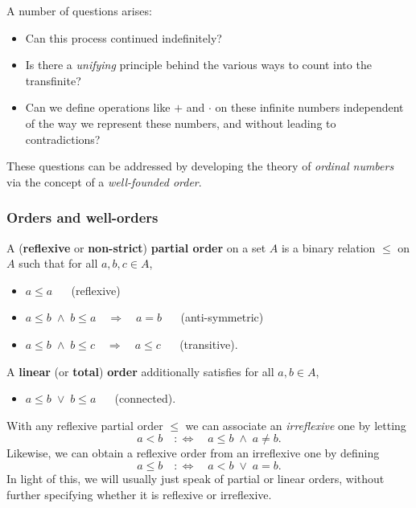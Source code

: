 A number of questions arises:

\begin{itemize}
\item Can this process continued indefinitely?
\item Is there a \textit{unifying} principle behind the various ways to count into the transfinite?
\item Can we define operations like $+$ and $\cdot$ on these infinite numbers independent of the way we represent these numbers, and without leading to contradictions?
\end{itemize}

These questions can be addressed by developing the theory of \textit{ordinal numbers} via the concept of a \textit{well-founded order}.

\subsubsection{Orders and well-orders}

\begin{definition}A (\textbf{reflexive} or \textbf{non-strict}) \textbf{partial order} on a set $A$ is a binary relation $\leq$ on $A$ such that for all $a,b,c \in A$,

\begin{itemize}
\item $a\leq a$   (reflexive)


\item $a \leq b \; \wedge \; b \leq a \quad \Rightarrow \quad a = b$   (anti-symmetric)


\item $a \leq b \; \wedge \; b \leq c \quad \Rightarrow \quad a \leq c$   (transitive).
\end{itemize}

A \textbf{linear} (or \textbf{total}) \textbf{order} additionally satisfies for all $a,b \in A$,

\begin{itemize}
\item $a \leq b \; \vee \; b \leq a$    (connected).
\end{itemize}

\end{definition}With any reflexive partial order $\leq$ we can associate an \textit{irreflexive} one by letting
\begin{equation}
a < b \quad :\iff \quad a \leq b \; \wedge \; a \neq b.
\end{equation}
Likewise, we can obtain a reflexive order from an irreflexive one by defining
\begin{equation}
a \leq b \quad :\iff \quad a < b \; \vee \; a = b.
\end{equation}
In light of this, we will usually just speak of partial or linear orders, without further specifying whether it is reflexive or irreflexive.

